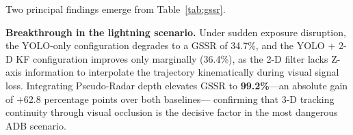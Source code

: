 \documentclass{jstarticle}
\theoremstyle{remark}
\begin{document}
\begin{table}[H]
\centering
\caption{GSSR, FDR, and MGR across the five test scenarios (\%)}
\label{tab:gssr}
\end{table}

Two principal findings emerge from Table~\ref{tab:gssr}.

\textbf{Breakthrough in the lightning scenario.} Under sudden
exposure disruption, the YOLO-only configuration degrades to a GSSR
of 34.7\%, and the YOLO + 2-D KF configuration improves only
marginally (36.4\%), as the 2-D filter lacks Z-axis information to
interpolate the trajectory kinematically during visual signal loss.
Integrating Pseudo-Radar depth elevates GSSR to \textbf{99.2\%}---an
absolute gain of $+$62.8 percentage points over both baselines---
confirming that 3-D tracking continuity through visual occlusion is
the decisive factor in the most dangerous ADB scenario.
\end{document}
